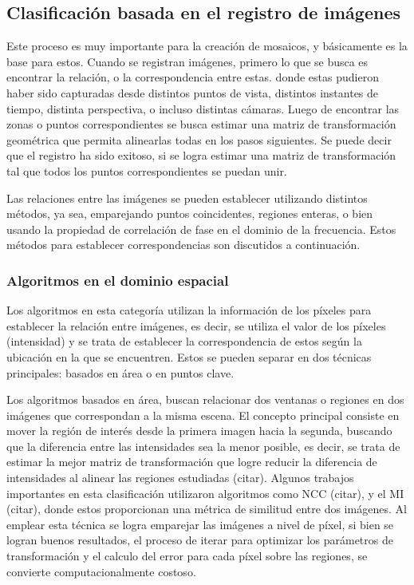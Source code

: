 \subsection*{Clasificación basada en el registro de imágenes}

Este proceso es muy importante para la creación de mosaicos, y básicamente es la base para estos. Cuando se registran imágenes, primero lo que se busca es encontrar la relación, o la correspondencia entre estas. donde estas pudieron haber sido capturadas desde distintos puntos de vista, distintos instantes de tiempo, distinta perspectiva, o incluso distintas cámaras. Luego de encontrar las zonas o puntos correspondientes se busca estimar una matriz de transformación geométrica que permita alinearlas todas en los pasos siguientes. Se puede decir que el registro ha sido exitoso, si se logra estimar una matriz de transformación tal que todos los puntos correspondientes se puedan unir.

Las relaciones entre las imágenes se pueden establecer utilizando distintos métodos, ya sea, emparejando puntos coincidentes, regiones enteras, o bien usando la propiedad de correlación de fase en el dominio de la frecuencia. Estos métodos para establecer correspondencias son discutidos a continuación.

\subsubsection*{Algoritmos en el dominio espacial}

Los algoritmos en esta categoría utilizan la información de los píxeles para establecer la relación entre imágenes, es decir, se utiliza el valor de los píxeles (intensidad) y se trata de establecer la correspondencia de estos según la ubicación en la que se encuentren. Estos se pueden separar en dos técnicas principales: basados en área o en puntos clave.

Los algoritmos basados en área, buscan relacionar dos ventanas o regiones en dos imágenes que correspondan a la misma escena. El concepto principal consiste en mover la región de interés desde la primera imagen hacia la segunda, buscando que la diferencia entre las intensidades sea la menor posible, es decir,  se trata de estimar la mejor matriz de transformación que logre reducir la diferencia de intensidades al alinear las regiones estudiadas (citar). Algunos trabajos importantes en esta clasificación utilizaron algoritmos como NCC (citar), y el MI (citar), donde estos proporcionan una métrica de similitud entre dos imágenes. Al emplear esta técnica se logra emparejar las imágenes a nivel de píxel, si bien se logran buenos resultados, el proceso de iterar para optimizar los parámetros de transformación y el calculo del error para cada píxel sobre las regiones, se convierte computacionalmente costoso.

